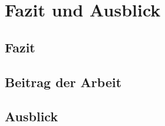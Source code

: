\section{Fazit und Ausblick}

\subsection{Fazit}

\subsection{Beitrag der Arbeit}

\subsection{Ausblick}
